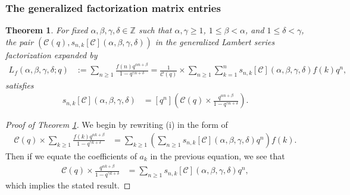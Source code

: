 \documentclass[12pt,reqno,a4letter]{article}
\numberwithin{figure}{section}
\numberwithin{table}{section}
\numberwithin{equation}{section}
\theoremstyle{plain}
\newtheorem{theorem}{Theorem}
\numberwithin{theorem}{section}
\theoremstyle{definition}
\begin{document}
\subsubsection{The generalized factorization matrix entries} 
\begin{theorem} 
\label{theorem1_GenFormula_for_snk} 
For fixed $\alpha, \beta, \gamma, \delta \in \mathbb{Z}$ such that 
$\alpha, \gamma \geq 1$, $1 \leq \beta < \alpha$, and $1 \leq \delta < \gamma$, the 
pair $(\mathcal{C}(q), s_{n,k}[\mathcal{C}](\alpha, \beta, \gamma, \delta))$ in the 
generalized Lambert series factorization expanded by 
\begin{align*} 
\tag{i}
L_f(\alpha, \beta, \gamma, \delta; q) & := 
     \sum_{n \geq 1} \frac{f(n) q^{\alpha n + \beta}}{1-q^{\gamma n+\delta}} = 
     \frac{1}{\mathcal{C}(q)} \times 
     \sum_{n \geq 1} \sum_{k=1}^n s_{n,k}[\mathcal{C}](\alpha, \beta, \gamma, \delta) f(k) 
     q^n, 
\end{align*} 
satisfies 
\begin{align*} 
s_{n,k}[\mathcal{C}](\alpha, \beta, \gamma, \delta) & = 
     [q^n]\left(\mathcal{C}(q) \times \frac{q^{\alpha n + \beta}}{1-q^{\gamma n+\delta}}\right). 
\end{align*} 
\end{theorem}
\begin{proof}[Proof of Theorem \ref{theorem1_GenFormula_for_snk}]
We begin by rewriting (i) in the form of 
\begin{align*} 
\mathcal{C}(q) \times \sum_{k \geq 1} \frac{f(k) q^{\alpha k+\beta}}{1-q^{\gamma k+\delta}} & = 
     \sum_{k \geq 1} \left(\sum_{n \geq 1} s_{n,k}[\mathcal{C}](\alpha, \beta, \gamma, \delta) q^n\right) f(k). 
\end{align*} 
Then if we equate the coefficients of $a_k$ in the previous equation, we see that 
\begin{align*} 
\mathcal{C}(q) \times \frac{q^{\alpha k+\beta}}{1-q^{\gamma k+\delta}} & = 
     \sum_{n \geq 1} s_{n,k}[\mathcal{C}](\alpha, \beta, \gamma, \delta) q^n, 
\end{align*} 
which implies the stated result. 
\end{proof} 
\end{document}
